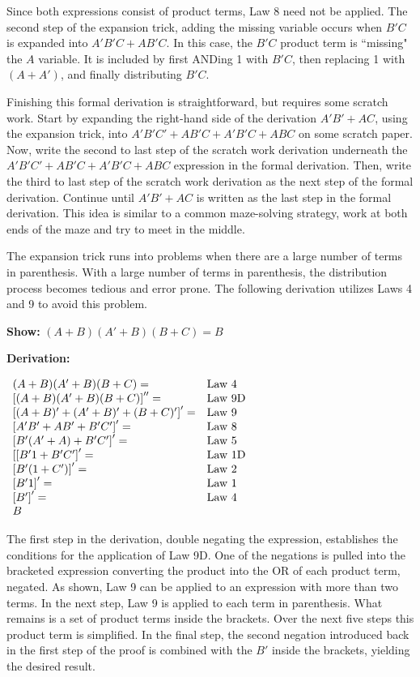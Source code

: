 Since both expressions consist of product terms, Law 8 need not be applied.
 The second step of the expansion trick,
adding the missing variable occurs when $B'C$ is expanded 
into $A'B'C + AB'C$.  In this case, the $B'C$ product term is 
``missing" the $A$ variable.  It is included by first ANDing 1 
with $B'C$, then replacing 1 with $(A+A')$, and finally
distributing $B'C$.  

Finishing this formal derivation is 
straightforward, but requires some scratch work.  Start by 
expanding the right-hand side of the derivation $A'B' + AC$,
using the expansion trick, into $A'B'C' + AB'C +A'B'C + ABC$ 
on some scratch paper.  Now, 
write the second to last step of the scratch work derivation underneath 
the $A'B'C' + AB'C +A'B'C + ABC$ expression in the formal 
derivation.  Then, write the third to last step of the scratch 
work derivation as the next step of the formal derivation.
Continue until $A'B'+AC$ is written as the last step in
the formal derivation.  This idea is similar to a common maze-solving 
strategy, work at both ends of the maze and try to meet 
in the middle. 

The expansion trick runs into problems when there are a large
number of terms in parenthesis.  With a large number
of terms in parenthesis, the distribution process becomes tedious
and error prone. The following derivation utilizes Laws
4 and 9 to avoid this problem.

\textbf{Show:} $(A+B)(A'+B)(B+C) = B$

\textbf{Derivation:}

$\begin{array}[ht]{ll}
(A+B)(A'+B)(B+C) = 			& \text{Law 4} \\
\left[ (A+B)(A'+B)(B+C) \right] '' =& \text{Law 9D} \\
\left[ (A+B)'+(A'+B)'+(B+C)' \right]' = & \text{Law 9} \\
\left[ A'B'+AB'+B'C' \right]' = 	& \text{Law 8} \\
\left[ B'(A'+A)+B'C' \right]' = 	& \text{Law 5} \\
\left[ [B'1+ B'C' \right]' = 		& \text{Law 1D} \\
\left[ B'(1+C') \right]' = 		& \text{Law 2} \\
\left[ B'1 \right]' = 			& \text{Law 1} \\
\left[ B' \right]' = 			& \text{Law 4} \\
B  &  
\end{array}$

The first step in the derivation, double negating the expression, establishes 
the conditions for the application of Law 9D. One of the negations is
pulled into the bracketed expression converting the product into 
the OR of each product term, negated.  As shown, Law 9 can be applied
to an expression with more than two terms.  In the next step, Law 9 is 
applied to each term in parenthesis.  What remains is a set of product 
terms inside the brackets.  Over the next five steps this product term 
is simplified.  In the final step, the second negation introduced 
back in the first step of the proof is combined with the $B'$ 
inside the brackets, yielding the desired result.

